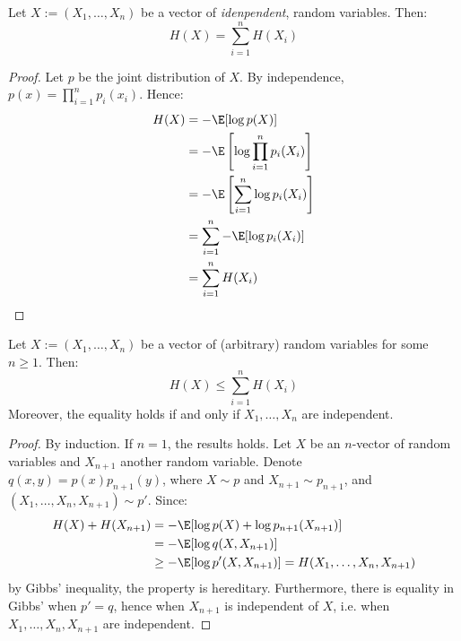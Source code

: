 \documentclass[toc, titlepaged]{../cs-classes/cs-classes}
\begin{document}
\begin{property}
    Let $X:=(X_1, \dots, X_n)$ be a vector of \emph{idenpendent}, random variables. Then:
    \begin{equation}
        \boxed{H(X)=\sum_{i=1}^n H(X_i)}
    \end{equation}
\end{property}

\begin{proof}
    Let $p$ be the joint distribution of $X$. By independence, $p(x)=\prod_{i=1}^n p_i(x_i)$. Hence:
    \begin{equation*}
        \begin{aligned}
            H(X)&=-\E[\log p(X)]\\
            &=-\E\left[\log\prod_{i=1}^n p_i(X_i)\right]\\
            &=-\E\left[\sum_{i=1}^n\log p_i(X_i)\right]\\
            &=\sum_{i=1}^n-\E[\log p_i(X_i)]\\
            &=\sum_{i=1}^n H(X_i)
        \end{aligned}
    \end{equation*}
\end{proof}

\begin{property}
    Let $X:=(X_1, \dots, X_n)$ be a vector of (arbitrary) random variables for some $n\geq 1$. Then:
    \begin{equation}
        \boxed{H(X)\leq \sum_{i=1}^n H(X_i)}
    \end{equation}
    Moreover, the equality holds if and only if $X_1, \dots, X_n$ are independent.
\end{property}

\begin{proof}
    By induction. If $n=1$, the results holds. Let $X$ be an $n$-vector of random variables and $X_{n+1}$ another random variable. Denote $q(x, y)=p(x)p_{n+1}(y)$, where $X\sim p$ and $X_{n+1}\sim p_{n+1}$, and $(X_1, \dots, X_n, X_{n+1})\sim p'$. Since:
    \begin{equation*}
        \begin{aligned}
            H(X) + H(X_{n+1}) &= -\E[\log p(X)+\log p_{n+1}(X_{n+1})]\\
            &=-\E[\log q(X, X_{n+1})]\\
            &\geq -\E[\log p'(X, X_{n+1})] = H(X_1, \dots, X_n, X_{n+1})
        \end{aligned}
    \end{equation*}
    by Gibbs' inequality, the property is hereditary. Furthermore, there is equality in Gibbs' when $p'=q$, hence when $X_{n+1}$ is independent of $X$, i.e. when $X_1, \dots, X_n, X_{n+1}$ are independent.
\end{proof}
\end{document}
